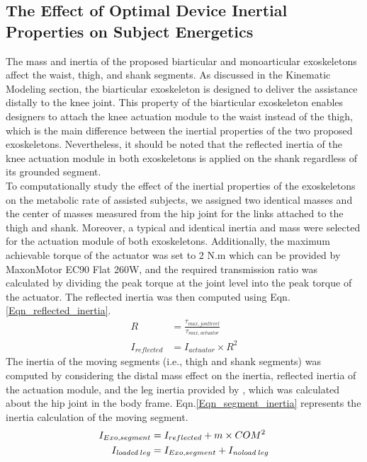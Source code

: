 \documentclass[10pt,letterpaper]{article}
\begin{document}
\subsection*{The Effect of Optimal Device Inertial Properties on Subject Energetics}
The mass and inertia of the proposed biarticular and monoarticular exoskeletons affect the waist, thigh, and shank segments. As discussed in the Kinematic Modeling section, the biarticular exoskeleton is designed to deliver the assistance distally to the knee joint. This property of the biarticular exoskeleton enables designers to attach the knee actuation module to the waist instead of the thigh, which is the main difference between the inertial properties of the two proposed exoskeletons. Nevertheless, it should be noted that the reflected inertia of the knee actuation module in both exoskeletons is applied on the shank regardless of its grounded segment.\\
To computationally study the effect of the inertial properties of the exoskeletons on the metabolic rate of assisted subjects, we assigned two identical masses and the center of masses measured from the hip joint for the links attached to the thigh and shank. Moreover, a typical and identical inertia and mass were selected for the actuation module of both exoskeletons. Additionally, the maximum achievable torque of the actuator was set to 2 N.m which can be provided by MaxonMotor EC90 Flat 260W, and the required transmission ratio was calculated by dividing the peak torque at the joint level into the peak torque of the actuator. The reflected inertia was then computed using Eqn.\eqref{Eqn_reflected_inertia}.\\
\begin{equation}\label{Eqn_reflected_inertia}
\begin{aligned}
R &= \frac{\tau_{max,jont level}}{\tau_{max,actuator}}\\
I_{reflected} &= I_{actuator}\times R^{2}
\end{aligned}
\end{equation}
The inertia of the moving segments (i.e., thigh and shank segments) was computed by considering the distal mass effect on the inertia, reflected inertia of the actuation module, and the leg inertia provided by \cite{133}, which was calculated about the hip joint in the body frame. Eqn.\eqref{Eqn_segment_inertia} represents the inertia calculation of the moving segment.
\begin{equation}\label{Eqn_segment_inertia}
\begin{aligned}
I_{Exo,segment} &= I_{reflected} + m\times COM^{2}\\
I_{\textit{loaded}\;leg} &= I_{Exo,segment} + I_{\textit{\textit{noload}}\;leg}
\end{aligned}
\end{equation}
\end{document}
